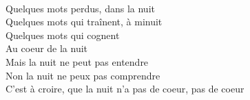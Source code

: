 \\
Quelques mots perdus, dans la nuit \\
Quelques mots qui traînent, à minuit \\
Quelques mots qui cognent \\
Au coeur de la nuit \\
Mais la nuit ne peut pas entendre \\
Non la nuit ne peux pas comprendre \\
C'est à croire, que la nuit n'a pas de coeur, pas de coeur \\
